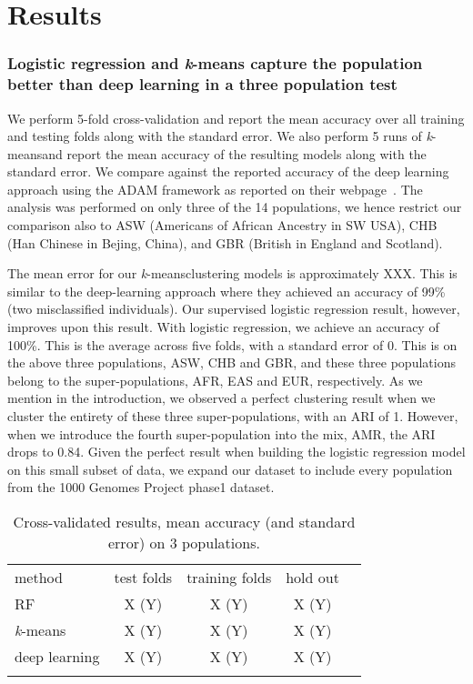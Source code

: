 \documentclass{llncs}
\newcommand{\kMeans}{\textit{k}-means}
\begin{document}
{%
\section{Results}
%
\subsubsection{Logistic regression and \kMeans{} capture the population better than deep learning in a three population test}
We perform 5-fold cross-validation and report the mean accuracy over all training and testing folds along with the standard error.
We also perform 5 runs of \kMeans and report the mean accuracy of the resulting models along with the standard error. 
We compare against the reported accuracy of the deep learning approach using the ADAM framework as reported on their webpage~\cite{Ferguson}. 
The analysis was performed on only three of the 14 populations, we hence restrict our comparison also to ASW (Americans of African Ancestry in SW USA), CHB (Han Chinese in Bejing, China), and GBR (British in England and Scotland).

The mean error for our \kMeans clustering models is approximately XXX. This is similar to the deep-learning approach where they achieved an accuracy of 99\% (two misclassified individuals). Our supervised logistic regression result, however, improves upon this result.
With logistic regression, we achieve an accuracy of 100\%. This is the average across five folds, with a standard error of 0. This is on the above three populations, ASW, CHB and GBR, and these three populations belong to the super-populations, AFR, EAS and EUR, respectively.
As we mention in the introduction, we observed a perfect clustering result when we cluster the entirety of these three super-populations, with an ARI of 1. However, when we introduce the fourth super-population into the mix, AMR, the ARI drops to 0.84.
Given the perfect result when building the logistic regression model on this small subset of data, we expand our dataset to include every population from the 1000 Genomes Project phase1 dataset.  




\begin{table}
\caption{Cross-validated results, mean accuracy (and standard error) on 3 populations.}
\begin{center}
\renewcommand{\arraystretch}{1.4}
\setlength\tabcolsep{3pt}
\begin{tabular}{lcccc}
\hline\noalign{\smallskip}
method  & test folds & training folds & hold out \\
RF  & X (Y) & X (Y) & X (Y) \\
\kMeans & X (Y) & X (Y) & X (Y) \\
deep learning & X (Y) & X (Y) & X (Y) \\
\noalign{\smallskip}
\hline
\end{tabular}
\end{center}
\end{table}

}
\end{document}
